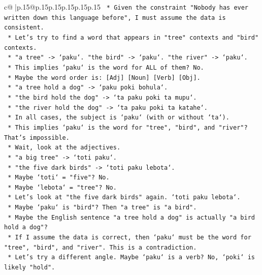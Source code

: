 \documentclass{article}
\begin{document}
{\begin{supertabular}{c@{$\;$}|p{.15\linewidth}@{}p{.15\linewidth}p{.15\linewidth}p{.15\linewidth}p{.15\linewidth}p{.15\linewidth}}
{{{\texttt{            *   Given the constraint "Nobody has ever written down this language before", I must assume the data is consistent.} \\
\texttt{            *   Let's try to find a word that appears in "tree" contexts and "bird" contexts.} \\
\texttt{            *   "a tree" {-}> `paku`. "the bird" {-}> `paku`. "the river" {-}> `paku`.} \\
\texttt{            *   This implies `paku` is the word for ALL of them? No.} \\
\texttt{            *   Maybe the word order is: {[}Adj{]} {[}Noun{]} {[}Verb{]} {[}Obj{]}.} \\
\texttt{            *   "a tree hold a dog" {-}> `paku poki bohula`.} \\
\texttt{            *   "the bird hold the dog" {-}> `ta paku poki ta mupu`.} \\
\texttt{            *   "the river hold the dog" {-}> `ta paku poki ta katahe`.} \\
\texttt{            *   In all cases, the subject is `paku` (with or without `ta`).} \\
\texttt{            *   This implies `paku` is the word for "tree", "bird", and "river"? That's impossible.} \\
\texttt{            *   Wait, look at the adjectives.} \\
\texttt{            *   "a big tree" {-}> `toti paku`.} \\
\texttt{            *   "the five dark birds" {-}> `toti paku lebota`.} \\
\texttt{            *   Maybe `toti` = "five"? No.} \\
\texttt{            *   Maybe `lebota` = "tree"? No.} \\
\texttt{            *   Let's look at "the five dark birds" again. `toti paku lebota`.} \\
\texttt{            *   Maybe `paku` is "bird"? Then "a tree" is "a bird".} \\
\texttt{            *   Maybe the English sentence "a tree hold a dog" is actually "a bird hold a dog"?} \\
\texttt{            *   If I assume the data is correct, then `paku` must be the word for "tree", "bird", and "river". This is a contradiction.} \\
\texttt{            *   Let's try a different angle. Maybe `paku` is a verb? No, `poki` is likely "hold".} \\
}}}
\end{supertabular}}
\end{document}
